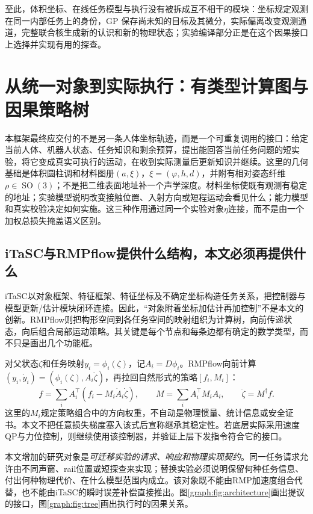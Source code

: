 \documentclass[11pt,a4paper]{article}
\numberwithin{equation}{section}
\theoremstyle{definition}
\DeclareMathOperator{\SO}{SO}
\begin{document}
至此，体积坐标、在线任务模型与执行没有被拆成互不相干的模块：坐标规定观测在同一内部任务上的身份，GP 保存尚未知的目标及其微分，实际偏离改变观测通道，完整联合核生成新的认识和新的物理状态；实验编译部分正是在这个因果接口上选择并实现有用的探查。


\section{从统一对象到实际执行：有类型计算图与因果策略树}
\label{graph:sec:architecture}

本框架最终应交付的不是另一条人体坐标轨迹，而是一个可重复调用的接口：给定当前人体、机器人状态、任务知识和剩余预算，提出能回答当前任务问题的短实验，将它变成真实可执行的运动，在收到实际测量后更新知识并继续。这里的几何基础是体积圆柱调和材料图册$(a,\xi)$，$\xi=(\varphi,h,d)$，并附有相对姿态纤维$\rho\in\SO(3)$；不是把二维表面地址补一个声学深度。材料坐标使既有观测有稳定的地址；实验模型说明改变接触位置、入射方向或短程运动会看见什么；能力模型和真实校验决定如何实施。这三种作用通过同一个实验对象$\eta$连接，而不是由一个加权总损失掩盖语义区别。

\subsection{iTaSC与RMPflow提供什么结构，本文必须再提供什么}

iTaSC以对象框架、特征框架、特征坐标及不确定坐标构造任务关系，把控制器与模型更新/估计模块闭环连接\cite{itasc2007}。因此，``对象附着坐标加估计再加控制''不是本文的创新。RMPflow则把构形空间到各任务空间的映射组织为计算树，向前传递状态，向后组合局部运动策略\cite{rmpflow2020}。其关键是每个节点和每条边都有确定的数学类型，而不只是画出几个功能框。

对父状态$\zeta$和任务映射$y_i=\phi_i(\zeta)$，记$A_i=D\phi_i$。RMPflow向前计算$(y_i,\dot y_i)=(\phi_i(\zeta),A_i\dot\zeta)$，再拉回自然形式的策略$[f_i,M_i]$：
\begin{equation}
 f=\sum_i A_i^\top(f_i-M_i\dot A_i\dot\zeta),\qquad
 M=\sum_i A_i^\top M_iA_i,\qquad \ddot\zeta=M^\dagger f.
 \label{graph:eq:rmp}
\end{equation}
这里的$M_i$规定策略组合中的方向权重，不自动是物理惯量、统计信息或安全证书。本文不把任意损失梯度塞入该式后宣称继承其稳定性。若底层实际采用速度QP与力位控制，则继续使用该控制器，并验证上层下发指令符合它的接口。

本文增加的研究对象是\emph{可迁移实验的请求、响应和物理实现契约}。同一任务请求允许由不同声窗、rail位置或短探查来实现；替换实验必须说明保留何种任务信息、付出何种物理代价、在什么模型范围内成立。该对象既不能由RMP加速度组合代替，也不能由iTaSC的瞬时误差补偿直接推出。图\ref{graph:fig:architecture}画出提议的接口，图\ref{graph:fig:tree}画出执行时的因果关系。
\end{document}
